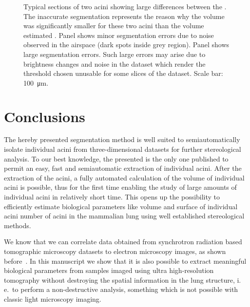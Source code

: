 \documentclass[final,paper=a4,DIV=calc,abstract,english]{scrartcl}
\newcommand{\ie}{i.\,e.\ }
\begin{document}
\begin{figure}
{		\label{subfig:60e_acinus38}%
	}%
	\hfill%
	\caption{Typical sections of two acini showing large differences between the .
		The inaccurate segmentation represents the reason why the  volume was significantly smaller for these two acini than the volume estimated .
		Panel \protect{} shows minor segmentation errors due to noise observed in the airspace (dark spots inside grey region).
		Panel \protect{} shows large segmentation errors.
		Such large errors may arise due to brightness changes and noise in the dataset which render the threshold chosen unusable for some slices of the dataset.
		Scale bar: \SI{100}{\micro\meter}.}
	\label{fig:MeVisSegmentation}
\end{figure}

\section{Conclusions}
The hereby presented segmentation method is well suited to semiautomatically isolate individual acini from three-dimensional datasets for further stereological analysis.
To our best knowledge, the presented  is the only one published to permit an easy, fast and semiautomatic extraction of individual acini.
After the extraction of the acini, a fully automated calculation of the volume of individual acini is possible, thus for the first time enabling the study of large amounts of individual acini in relatively short time.
This opens up the possibility to efficiently estimate biological parameters like volume and surface of individual acini number of acini in the mammalian lung using well established stereological methods.

We know that we can correlate data obtained from synchrotron radiation based tomographic microscopy datasets to electron microscopy images, as shown before~\citep{Haberthuer2009}.
In this manuscript we show that it is also possible to extract meaningful biological parameters from samples imaged using ultra high-resolution tomography without destroying the spatial information in the lung structure, \ie to perform a non-destructive analysis, something which is not possible with classic light microscopy imaging.
\end{document}
